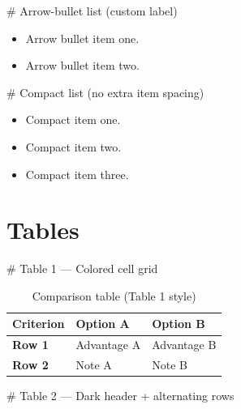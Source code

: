 \documentclass[12pt, a4paper]{article}
\newcommand{\snippetlabel}[1]{%
    \vspace{0.5em}%
    {\small\ttfamily\color{gray} \# #1}%
    \vspace{0.2em}%
}
\begin{document}
\snippetlabel{Arrow-bullet list (custom label)}

\begin{LTXexample}[pos=r, width=0.4]
\begin{itemize}[label=\textbf{$\rightarrow$}]
    \item Arrow bullet item one.
    \item Arrow bullet item two.
\end{itemize}
\end{LTXexample}

\snippetlabel{Compact list (no extra item spacing)}

\begin{LTXexample}[pos=r, width=0.4]
\begin{itemize}[noitemsep]
    \item Compact item one.
    \item Compact item two.
    \item Compact item three.
\end{itemize}
\end{LTXexample}

\section{Tables}

\snippetlabel{Table 1 — Colored cell grid}

\begin{table}[H]
    \centering
    \renewcommand{\arraystretch}{1.3}
    \setlength{\tabcolsep}{5pt}
    \begin{tabular}{|p{2.5cm}|p{5cm}|p{5cm}|}
        \hline
        \rowcolor{gray!20}
        \textbf{Criterion} & \textbf{Option A} & \textbf{Option B} \\
        \hline
        \rowcolor{gray!15}
        \textbf{Row 1}
        & \cellcolor{green!10} Advantage A
        & \cellcolor{blue!10} Advantage B \\
        \hline
        \rowcolor{gray!15}
        \textbf{Row 2}
        & \cellcolor{orange!10} Note A
        & \cellcolor{red!10} Note B \\
        \hline
    \end{tabular}
    \caption{Comparison table (Table 1 style)}
    \label{tab:style1}
\end{table}

\snippetlabel{Table 2 — Dark header + alternating rows}
\end{document}
